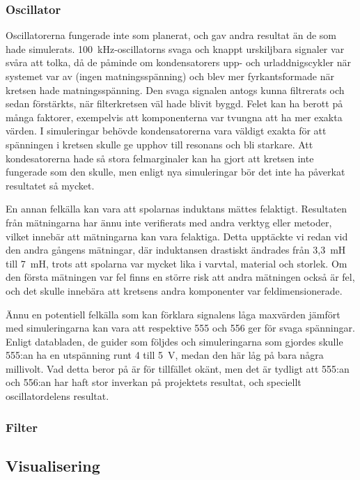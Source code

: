 \documentclass[a4paper]{article}
\begin{document}
\begin{sloppypar}
    \subsubsection{Oscillator}
    Oscillatorerna fungerade inte som planerat, och gav andra resultat än de som hade simulerats.
    100~kHz-oscillatorns svaga och knappt urskiljbara signaler var svåra att tolka, då de påminde om kondensatorers upp- och urladdnigscykler när systemet var av (ingen matningsspänning) och blev mer fyrkantsformade när kretsen hade matningsspänning.
    Den svaga signalen antogs kunna filtrerats och sedan förstärkts, när filterkretsen väl hade blivit byggd.
    Felet kan ha berott på många faktorer, exempelvis att komponenterna var tvungna att ha mer exakta värden.
    I simuleringar behövde kondensatorerna vara väldigt exakta för att spänningen i kretsen skulle ge upphov till resonans och bli starkare.
    Att kondesatorerna hade så stora felmarginaler kan ha gjort att kretsen inte fungerade som den skulle, men enligt nya simuleringar bör det inte ha påverkat resultatet så mycket.

    En annan felkälla kan vara att spolarnas induktans mättes felaktigt. Resultaten från mätningarna har ännu inte verifierats med andra verktyg eller metoder, vilket innebär att mätningarna kan vara felaktiga.
    Detta upptäckte vi redan vid den andra gångens mätningar, där induktansen drastiskt ändrades från 3,3~mH till 7~mH, trots att spolarna var mycket lika i varvtal, material och storlek. Om den första mätningen var fel finns en större risk att andra mätningen också är fel, och det skulle innebära att kretsens andra komponenter var feldimensionerade.

    Ännu en potentiell felkälla som kan förklara signalens låga maxvärden jämfört med simuleringarna kan vara att respektive 555 och 556 ger för svaga spänningar. Enligt databladen, de guider som följdes och simuleringarna som gjordes skulle 555:an ha en utspänning runt 4 till 5~V, medan den här låg på bara några millivolt.
    Vad detta beror på är för tillfället okänt, men det är tydligt att 555:an och 556:an har haft stor inverkan på projektets resultat, och speciellt oscillatordelens resultat.
    \subsubsection{Filter}

    \subsection{Visualisering}

\end{sloppypar}
\end{document}
